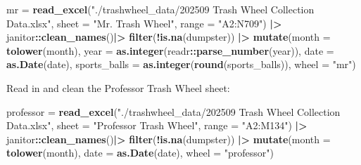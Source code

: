\documentclass[
]{article}
\newenvironment{Shaded}{\begin{snugshade}}{\end{snugshade}}
\newcommand{\AttributeTok}[1]{\textcolor[rgb]{0.13,0.29,0.53}{#1}}
\newcommand{\FunctionTok}[1]{\textcolor[rgb]{0.13,0.29,0.53}{\textbf{#1}}}
\newcommand{\NormalTok}[1]{#1}
\newcommand{\OtherTok}[1]{\textcolor[rgb]{0.56,0.35,0.01}{#1}}
\newcommand{\SpecialCharTok}[1]{\textcolor[rgb]{0.81,0.36,0.00}{\textbf{#1}}}
\newcommand{\StringTok}[1]{\textcolor[rgb]{0.31,0.60,0.02}{#1}}
\begin{document}
\begin{Shaded}
\begin{Highlighting}[]
\NormalTok{mr }\OtherTok{=} 
  \FunctionTok{read\_excel}\NormalTok{(}\StringTok{"./trashwheel\_data/202509 Trash Wheel Collection Data.xlsx"}\NormalTok{,}
                           \AttributeTok{sheet =} \StringTok{"Mr. Trash Wheel"}\NormalTok{,}
                           \AttributeTok{range =} \StringTok{"A2:N709"}\NormalTok{) }\SpecialCharTok{|\textgreater{}}
\NormalTok{  janitor}\SpecialCharTok{::}\FunctionTok{clean\_names}\NormalTok{()}\SpecialCharTok{|\textgreater{}}
  \FunctionTok{filter}\NormalTok{(}\SpecialCharTok{!}\FunctionTok{is.na}\NormalTok{(dumpster)) }\SpecialCharTok{|\textgreater{}}
  \FunctionTok{mutate}\NormalTok{(}\AttributeTok{month =} \FunctionTok{tolower}\NormalTok{(month),}
         \AttributeTok{year  =} \FunctionTok{as.integer}\NormalTok{(readr}\SpecialCharTok{::}\FunctionTok{parse\_number}\NormalTok{(year)),}
         \AttributeTok{date  =} \FunctionTok{as.Date}\NormalTok{(date),}
         \AttributeTok{sports\_balls =} \FunctionTok{as.integer}\NormalTok{(}\FunctionTok{round}\NormalTok{(sports\_balls)),}
         \AttributeTok{wheel =} \StringTok{"mr"}\NormalTok{)}
\end{Highlighting}
\end{Shaded}

Read in and clean the Professor Trash Wheel sheet:

\begin{Shaded}
\begin{Highlighting}[]
\NormalTok{professor }\OtherTok{=} 
  \FunctionTok{read\_excel}\NormalTok{(}\StringTok{"./trashwheel\_data/202509 Trash Wheel Collection Data.xlsx"}\NormalTok{,}
                           \AttributeTok{sheet =} \StringTok{"Professor Trash Wheel"}\NormalTok{,}
                           \AttributeTok{range =} \StringTok{"A2:M134"}\NormalTok{) }\SpecialCharTok{|\textgreater{}}
\NormalTok{  janitor}\SpecialCharTok{::}\FunctionTok{clean\_names}\NormalTok{()}\SpecialCharTok{|\textgreater{}}
  \FunctionTok{filter}\NormalTok{(}\SpecialCharTok{!}\FunctionTok{is.na}\NormalTok{(dumpster)) }\SpecialCharTok{|\textgreater{}}
  \FunctionTok{mutate}\NormalTok{(}\AttributeTok{month =} \FunctionTok{tolower}\NormalTok{(month),}
         \AttributeTok{date  =} \FunctionTok{as.Date}\NormalTok{(date),}
         \AttributeTok{wheel =} \StringTok{"professor"}\NormalTok{)}
\end{Highlighting}
\end{Shaded}
\end{document}
